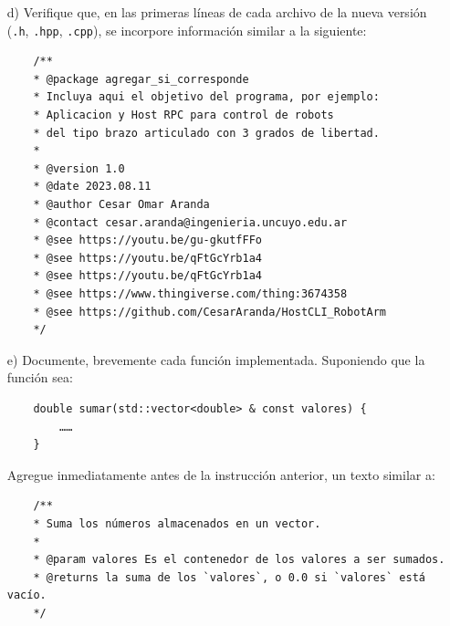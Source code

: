 \documentclass[a4paper,12pt]{article}
\begin{document}
\begin{itemize}
    \item[d)] Verifique que, en las primeras líneas de cada archivo de la nueva versión (\texttt{.h}, \texttt{.hpp}, \texttt{.cpp}), se incorpore información similar a la siguiente:
    \begin{verbatim}
    /**
    * @package agregar_si_corresponde
    * Incluya aqui el objetivo del programa, por ejemplo:
    * Aplicacion y Host RPC para control de robots
    * del tipo brazo articulado con 3 grados de libertad.
    *
    * @version 1.0
    * @date 2023.08.11
    * @author Cesar Omar Aranda
    * @contact cesar.aranda@ingenieria.uncuyo.edu.ar
    * @see https://youtu.be/gu-gkutfFFo
    * @see https://youtu.be/qFtGcYrb1a4
    * @see https://youtu.be/qFtGcYrb1a4
    * @see https://www.thingiverse.com/thing:3674358
    * @see https://github.com/CesarAranda/HostCLI_RobotArm
    */
    \end{verbatim}

    \item[e)] Documente, brevemente cada función implementada. Suponiendo que la función sea:
    \begin{verbatim}
    double sumar(std::vector<double> & const valores) {
        ……
    }
    \end{verbatim}
    Agregue inmediatamente antes de la instrucción anterior, un texto similar a:
    \begin{verbatim}
    /**
    * Suma los números almacenados en un vector.
    *
    * @param valores Es el contenedor de los valores a ser sumados.
    * @returns la suma de los `valores`, o 0.0 si `valores` está vacío.
    */
    \end{verbatim}
    

\end{itemize}
\end{document}
